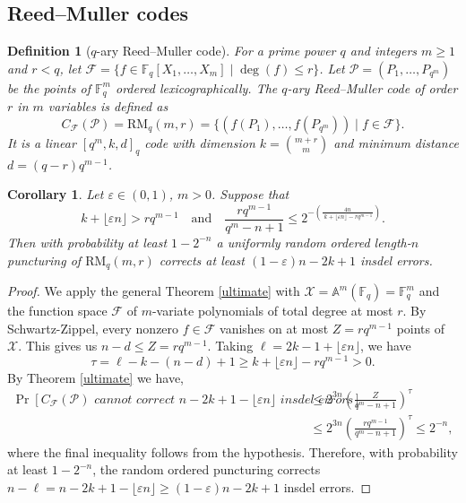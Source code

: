 \documentclass[draft, onecolumn, 11pt]{IEEEtran}
\newtheorem{definition}[theorem]{Definition}
\newtheorem{corollary}[theorem]{Corollary}
\newcommand{\F}{\mathbb{F}}
\begin{document}
\subsection{Reed--Muller codes}
\begin{definition}[$q$-ary Reed--Muller code]
    For a prime power $q$ and integers $m \geq 1$ and $r < q$, let $\mathcal{F} = \lbrace f \in \F_q[X_1,\dots,X_m] \mid \deg(f)\leq r\rbrace$. Let $\mathcal{P} = (P_1, \dots, P_{q^m})$ be the points of $\F_q^m$ ordered lexicographically. The $q$-ary Reed--Muller code of order $r$ in $m$ variables is defined as
    $$C_{\mathcal{F}}(\mathcal{P}) = \mathrm{RM}_q(m,r) = \lbrace \left(f(P_1),\dots,f(P_{q^m})\right) \mid f \in \mathcal{F} \rbrace.$$ 
    It is a linear $[q^m,k,d]_q$ code with dimension $k=\binom{m+r}{m}$ and minimum distance $d = (q-r)q^{m-1}$.
\end{definition}

\begin{corollary} \label{RMq}
    Let $\varepsilon \in (0,1)$, $m > 0$. Suppose that 
    $$k+ \lfloor\varepsilon n\rfloor > rq^{m-1} \quad \text{and} \quad \frac{rq^{m-1}}{q^m-n+1} \leq 2^{-\left(\frac{4n}{\,k+\lfloor\varepsilon n\rfloor-rq^{m-1}}\right)}.$$
    Then with probability at least $1-2^{-n}$ a uniformly random ordered length-$n$ puncturing of $\mathrm{RM}_q(m,r)$ corrects at least $(1 - \varepsilon)n-2k+1$ insdel errors.
\end{corollary}

\begin{proof}
    We apply the general Theorem \ref{ultimate} with $\mathcal{X}=\mathbb{A}^m(\F_q)=\F_q^m$ and the function space $\mathcal{F}$ of $m$-variate polynomials of total degree at most $r$. By Schwartz-Zippel, every nonzero $f \in \mathcal{F}$ vanishes on at most $Z = rq^{m-1}$ points of $\mathcal{X}$. This gives us $n-d \leq Z = rq^{m-1}$. Taking $\ell=2k - 1 + \lfloor\varepsilon n\rfloor$, we have 
    $$\tau = \ell-k-(n-d)+1 \geq k + \lfloor\varepsilon n\rfloor -rq^{m-1} > 0.$$
    By Theorem \ref{ultimate} we have, 
    \begin{align*}
        \Pr[C_{\mathcal{F}}(\mathcal{P}) \textit{ cannot correct $n-2k + 1 - \lfloor \varepsilon n \rfloor$ insdel errors}] &\leq 2^{3n}\left(\frac{Z}{q^m-n+1}\right)^\tau \\
        &\leq 2^{3n}\left(\frac{rq^{m-1}}{q^m-n+1}\right)^\tau \leq 2^{-n},
    \end{align*}
    where the final inequality follows from the hypothesis. Therefore, with probability at least $1-2^{-n}$, the random ordered puncturing corrects $n-\ell = n-2k+1-\lfloor\varepsilon n\rfloor \geq (1 - \varepsilon)n - 2k + 1$ insdel errors.
\end{proof}
\end{document}
